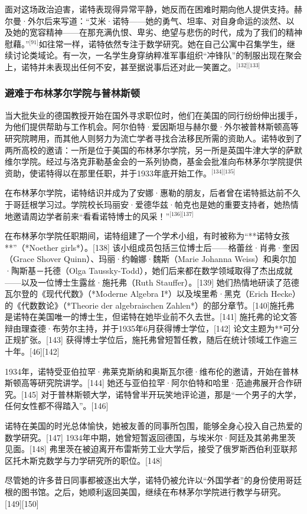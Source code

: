 面对这场政治迫害，诺特表现得异常平静，她反而在困难时期向他人提供支持。赫尔曼·外尔后来写道：“艾米·诺特——她的勇气、坦率、对自身命运的淡然、以及她的宽容精神——在那充满仇恨、卑劣、绝望与悲伤的时代，成为了我们的精神慰藉。”\(^\text{[91]}\)如往常一样，诺特依然专注于数学研究。她在自己公寓中召集学生，继续讨论类域论。有一次，一名学生身穿纳粹准军事组织“冲锋队”的制服出现在聚会上，诺特并未表现出任何不安，甚至据说事后还对此一笑置之。\(^\text{[132][133]}\)
\subsubsection{避难于布林茅尔学院与普林斯顿}
当大批失业的德国教授开始在国外寻求职位时，他们在美国的同行纷纷伸出援手，为他们提供帮助与工作机会。阿尔伯特·爱因斯坦与赫尔曼·外尔被普林斯顿高等研究院聘用，而其他人则努力为流亡学者寻找合法移民所需的资助人。诺特收到了两所高校的邀请：一所是位于美国的布林茅尔学院，另一所是英国牛津大学的萨默维尔学院。经过与洛克菲勒基金会的一系列协商，基金会批准向布林茅尔学院提供资助，使诺特得以在那里任职，并于1933年底开始工作。\(^\text{[134][135]}\)

在布林茅尔学院，诺特结识并成为了安娜·惠勒的朋友，后者曾在诺特抵达前不久于哥廷根学习过。学院校长玛丽安·爱德华兹·帕克也是她的重要支持者，她热情地邀请周边学者前来“看看诺特博士的风采！”\(^\text{[136][137]}\)

在布林茅尔学院任职期间，诺特组建了一个学术小组，有时被称为“**诺特女孩**”（*Noether girls*）。[138] 该小组成员包括三位博士后——格蕾丝·肖弗·奎因（Grace Shover Quinn）、玛丽·约翰娜·魏斯（Marie Johanna Weiss）和奥尔加·陶斯基－托德（Olga Taussky-Todd），她们后来都在数学领域取得了杰出成就——以及一位博士生露丝·施托弗（Ruth Stauffer）。[139] 她们热情地研读了范德瓦尔登的《现代代数》（*Moderne Algebra I*）以及埃里希·黑克（Erich Hecke）的《代数数论》（*Theorie der algebraischen Zahlen*）的部分章节。[140]施托弗是诺特在美国唯一的博士生，但诺特在她毕业前不久去世。[141] 施托弗的论文答辩由理查德·布劳尔主持，并于1935年6月获得博士学位，[142] 论文主题为**可分正规扩张。[143] 获得博士学位后，施托弗曾短暂任教，随后在统计领域工作逾三十年。[46][142]

1934年，诺特受亚伯拉罕·弗莱克斯纳和奥斯瓦尔德·维布伦的邀请，开始在普林斯顿高等研究院讲学。[144] 她还与亚伯拉罕·阿尔伯特和哈里·范迪弗展开合作研究。[145] 对于普林斯顿大学，诺特曾半开玩笑地评论道，那是“一个男子的大学，任何女性都不得踏入”。[146]

诺特在美国的时光总体愉快，她被友善的同事所包围，能够全身心投入自己热爱的数学研究。[147] 1934年中期，她曾短暂返回德国，与埃米尔·阿廷及其弟弗里茨见面。[148] 弗里茨在被迫离开布雷斯劳工业大学后，接受了俄罗斯西伯利亚联邦区托木斯克数学与力学研究所的职位。[148]

尽管她的许多昔日同事都被逐出大学，诺特仍被允许以“外国学者”的身份使用哥廷根的图书馆。之后，她顺利返回美国，继续在布林茅尔学院进行教学与研究。[149][150]
